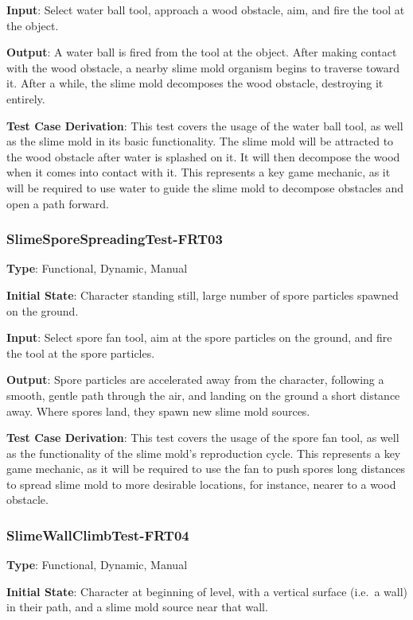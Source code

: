 \documentclass[12pt, titlepage]{article}
\begin{document}
\textbf{Input}: Select water ball tool, approach a wood obstacle, aim,
and fire the tool at the object.

\textbf{Output}: A water ball is fired from the tool at the object.
After making contact with the wood obstacle, a nearby slime mold organism
begins to traverse toward it. After a while, the slime mold decomposes the
wood obstacle, destroying it entirely.

\textbf{Test Case Derivation}: This test covers the usage of the water ball
tool, as well as the slime mold in its basic functionality. The slime mold
will be attracted to the wood obstacle after water is splashed on it. It will
then decompose the wood when it comes into contact with it. This represents a key
game mechanic, as it will be required to use water to guide the slime mold to
decompose obstacles and open a path forward.


\subsubsection{SlimeSporeSpreadingTest-FRT03}

\textbf{Type}: Functional, Dynamic, Manual

\textbf{Initial State}: Character standing still, large number of spore
particles spawned on the ground.

\textbf{Input}: Select spore fan tool, aim at the spore particles on the
ground, and fire the tool at the spore particles.

\textbf{Output}: Spore particles are accelerated away from the character,
following a smooth, gentle path through the air, and landing on the ground
a short distance away. Where spores land, they spawn new slime mold sources.

\textbf{Test Case Derivation}: This test covers the usage of the spore fan
tool, as well as the functionality of the slime mold's reproduction cycle.
This represents a key game mechanic, as it will be required to use the fan
to push spores long distances to spread slime mold to more desirable locations,
for instance, nearer to a wood obstacle.


\subsubsection{SlimeWallClimbTest-FRT04}

\textbf{Type}: Functional, Dynamic, Manual

\textbf{Initial State}: Character at beginning of level, with a vertical
surface (i.e.\ a wall) in their path, and a slime mold source near that wall.
\end{document}
